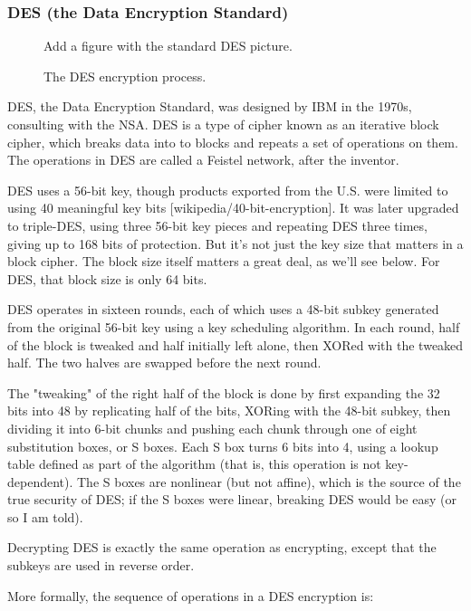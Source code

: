 \subsubsection{DES (the Data Encryption Standard)}

\begin{figure}
  {\color{Magenta} Add a figure with the standard DES picture.}
  \caption{The DES encryption process.}
  \label{fig:des}
\end{figure}

DES, the Data Encryption Standard, was designed by IBM in the 1970s,
consulting with the NSA.  DES is a type of cipher known as an
iterative block cipher, which breaks data into to blocks and repeats a
set of operations on them.  The operations in DES are called a Feistel
network, after the inventor.

DES uses a 56-bit key, though products exported from the U.S. were
limited to using 40 meaningful key bits [wikipedia/40-bit-encryption].
It was later upgraded to triple-DES, using three 56-bit key pieces and
repeating DES three times, giving up to 168 bits of protection.  But
it's not just the key size that matters in a block cipher.  The block
size itself matters a great deal, as we'll see below.  For DES, that
block size is only 64 bits.

DES operates in sixteen rounds, each of which uses a 48-bit subkey
generated from the original 56-bit key using a key scheduling
algorithm.  In each round, half of the block is tweaked and half
initially left alone, then XORed with the tweaked half.  The two
halves are swapped before the next round.

The "tweaking" of the right half of the block is done by first
expanding the 32 bits into 48 by replicating half of the bits, XORing
with the 48-bit subkey, then dividing it into 6-bit chunks and pushing
each chunk through one of eight substitution boxes, or S boxes.  Each
S box turns 6 bits into 4, using a lookup table defined as part of the
algorithm (that is, this operation is not key-dependent).  \aono{} The S boxes
are nonlinear (but not affine), which is the source of the true
security of DES; if the S boxes were linear, breaking DES would be
easy (or so I am told).

Decrypting DES is exactly the same operation as encrypting, except
that the subkeys are used in reverse order.

More formally, the sequence of operations in a DES encryption
is:

